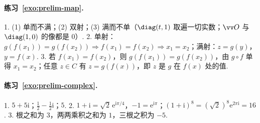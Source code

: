 \paragraph*{练习~\ref{exo:prelim-map}.} 1. (1) 单而不满；(2) 双射；(3) 满而不单（$\diag(t,1)$ 取遍一切实数；$\vv O$ 与 $\diag(1,0)$ 的像都是 $0$）. 2. 单射：$g(f(x_1))=g(f(x_2))\Rightarrow f(x_1)=f(x_2)\Rightarrow x_1=x_2$；满射：$z=g(y)$，$y=f(x)$. 3. 若 $f(x_1)=f(x_2)$，则 $g(f(x_1))=g(f(x_2))$，由 $g\circ f$ 单得 $x_1=x_2$；任意 $z\in C$ 有 $z=g(f(x))$，即 $z$ 是 $g$ 在 $f(x)$ 处的值.


\paragraph*{练习~\ref{exo:prelim-complex}.} 1. $5+5\mathrm i$；$\frac12-\frac12\mathrm i$；$5$. 2. $1+\mathrm i=\sqrt2\,\mathrm e^{\mathrm i\pi/4}$，$-1=\mathrm e^{\mathrm i\pi}$；$(1+\mathrm i)^8=(\sqrt2)^8\mathrm e^{2\pi\mathrm i}=16$. 3. 根之和为 $3$，两两乘积之和为 $1$，三根之积为 $-5$.
